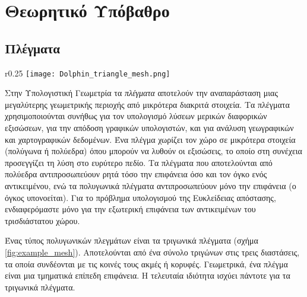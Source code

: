 \chapter{Θεωρητικό Υπόβαθρο}
\label{ch:theoretical_background}

\section{Πλέγματα}
\begin{wrapfigure}{r}{0.25\textwidth}
    \centering
    \texttt{[image: Dolphin\_triangle\_mesh.png]}
    \caption[Παράδειγμα Τριγωνικού Πλέγματος]{
        Παράδειγμα τριγωνικού πλέγματος που αναπαριστά ένα δελφίνι \cite{enwiki:1097100057}.
    }
    \label{fig:example_mesh}
\end{wrapfigure}
\label{sec:triangle_meshes}
Στην Υπολογιστική Γεωμετρία τα \textit{πλέγματα} αποτελούν την αναπαράσταση
μιας μεγαλύτερης γεωμετρικής περιοχής από μικρότερα διακριτά στοιχεία.
Τα πλέγματα χρησιμοποιούνται συνήθως για τον υπολογισμό λύσεων μερικών 
διαφορικών εξισώσεων, για την απόδοση γραφικών υπολογιστών, και για
ανάλυση γεωγραφικών και χαρτογραφικών δεδομένων.
Ένα πλέγμα χωρίζει τον χώρο σε μικρότερα στοιχεία (πολύγωνα ή πολύεδρα) όπου
μπορούν να λυθούν οι εξισώσεις, το οποίο στη συνέχεια προσεγγίζει τη λύση 
στο ευρύτερο πεδίο. 
Τα πλέγματα που αποτελούνται από πολύεδρα αντιπροσωπεύουν ρητά τόσο την 
επιφάνεια όσο και τον όγκο ενός αντικειμένου, ενώ τα πολυγωνικά 
πλέγματα αντιπροσωπεύουν μόνο την επιφάνεια (ο όγκος υπονοείται).
Για το πρόβλημα υπολογισμού της Ευκλείδειας απόστασης, ενδιαφερόμαστε 
μόνο για την εξωτερική επιφάνεια των αντικειμένων του τρισδιάστατου χώρου. 

Ένας τύπος πολυγωνικών πλεγμάτων είναι τα τριγωνικά πλέγματα 
(σχήμα \ref{fig:example_mesh}).
Αποτελούνται από ένα σύνολο τριγώνων στις τρεις διαστάσεις, 
τα οποία συνδέονται με τις κοινές τους ακμές ή κορυφές. 
Γεωμετρικά, ένα πλέγμα είναι μια τμηματικά επίπεδη επιφάνεια.
Η τελευταία ιδιότητα ισχύει πάντοτε για τα τριγωνικά πλέγματα.

